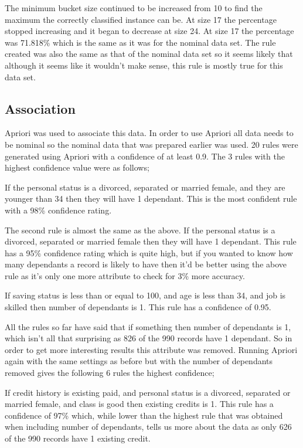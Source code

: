 \documentclass[12pt, a4paper]{article}
\begin{document}
	The minimum bucket size continued to be increased from 10 to find the maximum the correctly classified instance can be. At size 17 the percentage stopped increasing and it began to decrease at size 24. At size 17 the percentage was 71.818\% which is the same as it was for the nominal data set. The rule created was also the same as that of the nominal data set so it seems likely that although it seems like it wouldn't make sense, this rule is mostly true for this data set.
	
	\subsection{Association}
	Apriori was used to associate this data. In order to use Apriori all data needs to be nominal so the nominal data that was prepared earlier was used. 20 rules were generated using Apriori with a confidence of at least 0.9. The 3 rules with the highest confidence value were as follows;
	
	If the personal status is a divorced, separated or married female, and they are younger than 34 then they will have 1 dependant. This is the most confident rule with a 98\% confidence rating.
	
	The second rule is almost the same as the above. If the personal status is a divorced, separated or married female then they will have 1 dependant. This rule has a 95\% confidence rating which is quite high, but if you wanted to know how many dependants a record is likely to have then it'd be better using the above rule as it's only one more attribute to check for 3\% more accuracy.
	
	If saving status is less than or equal to 100, and age is less than 34, and job is skilled then number of dependants is 1. This rule has a confidence of 0.95.
	
	All the rules so far have said that if something then number of dependants is 1, which isn't all that surprising as 826 of the 990 records have 1 dependant. So in order to get more interesting results this attribute was removed. Running Apriori again with the same settings as before but with the number of dependants removed gives the following 6 rules the highest confidence;
	
	If credit history is existing paid, and personal status is a divorced, separated or married female, and class is good then existing credits is 1. This rule has a confidence of 97\% which, while lower than the highest rule that was obtained when including number of dependants, tells us more about the data as only 626 of the 990 records have 1 existing credit.
	
\end{document}

